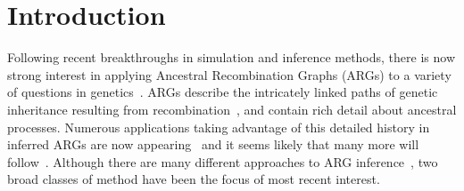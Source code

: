 \documentclass{article}
\begin{document}
\section*{Introduction}
Following recent breakthroughs in simulation and inference methods,
there is now strong interest in applying Ancestral Recombination Graphs (ARGs)
to a variety of questions in genetics~\citep{lewanski_era_2024,brandt_promise_2024,nielsen_inference_2025}. 
ARGs describe the intricately linked paths
of genetic inheritance resulting from
recombination~\citep{hudson_properties_1983,griffiths_ancestral_1996,wong_general_2023},
and contain rich detail about ancestral processes. 
Numerous applications taking advantage of this detailed history
in inferred ARGs are now appearing~\citep{
stern_approximate_2019,
fan_genealogical_2022,
hejase_deep_2022,
guo_recombination-aware_2022,
ignatieva_ongoing_2022,
wang_complex_2022,
zhang_biobank-scale_2023,
nowbandegani_extremely_2023,
ignatieva_distribution_2023,
fan_likelihood_2023,
osmond_estimating_2021,
huang_estimating_2024,
grundler_geographic_2024,
korfmann_simultaneous_2024,
deraje_inferring_2024,
speidel2025high}
and it seems likely that many more will
follow~\citep{harris_database_2019,harris_using_2023}.
Although there are many different approaches to ARG
inference~\citep{wong_general_2023}, two broad classes of method
have been the focus of most recent interest.
\end{document}
